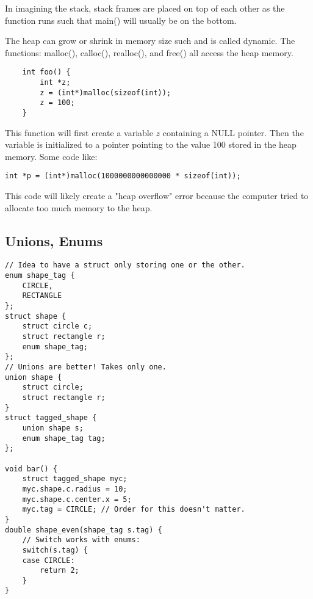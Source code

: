 \documentclass[12pt]{article}
\theoremstyle{definition}
\begin{document}
In imagining the stack, stack frames are placed on top of each other as the function runs such that main() will usually be on the bottom. 

The heap can grow or shrink in memory size such and is called dynamic. The functions: malloc(), calloc(), realloc(), and free() all access the heap memory. 
    \begin{lstlisting}
    int foo() {
        int *z;
        z = (int*)malloc(sizeof(int));
        z = 100;
    }
    \end{lstlisting}
This function will first create a variable $z$ containing a NULL pointer. Then the variable is initialized to a pointer pointing to the value 100 stored in the heap memory. 
Some code like:
\begin{lstlisting}
int *p = (int*)malloc(1000000000000000 * sizeof(int));
\end{lstlisting}
This code will likely create a "heap overflow" error because the computer tried to allocate too much memory to the heap. 
\subsection{Unions, Enums}
\begin{lstlisting}
// Idea to have a struct only storing one or the other.
enum shape_tag {
    CIRCLE,
    RECTANGLE
};
struct shape {
    struct circle c;
    struct rectangle r;
    enum shape_tag;
};
// Unions are better! Takes only one.
union shape {
    struct circle;
    struct rectangle r;
}
struct tagged_shape {
    union shape s;
    enum shape_tag tag;
};

void bar() {
    struct tagged_shape myc;
    myc.shape.c.radius = 10;
    myc.shape.c.center.x = 5;
    myc.tag = CIRCLE; // Order for this doesn't matter.
}
double shape_even(shape_tag s.tag) {
    // Switch works with enums:
    switch(s.tag) {
    case CIRCLE:
        return 2;
    }
}
\end{lstlisting}
\end{document}
